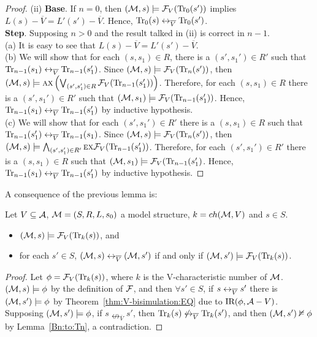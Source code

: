 \documentclass[letterpaper]{article} %
\begin{document}
\begin{proof}
(ii)  \textbf{Base}. If $n=0$, then $({\cal M}, s)  \models {\cal F}_V(\textrm{Tr}_0(s'))$ implies $L(s) - \overline V = L'(s') - \overline V$. Hence, $\textrm{Tr}_0(s) \leftrightarrow_{\overline V} \textrm{Tr}_0(s')$.\\
    \textbf{Step}. Supposing $n>0$ and the result talked in (ii) is correct in $n-1$.\\
   (a) It is easy to see that $L(s) - \overline V = L'(s') - \overline V$.\\
   (b) We will show that for each $(s, s_1) \in R$, there is a $(s', s_1') \in R'$ such that $\textrm{Tr}_{n-1}(s_1) \leftrightarrow_{\overline V} \textrm{Tr}_{n-1}(s_1')$.
      Since $({\cal M}, s) \models {\cal F}_V(\textrm{Tr}_n(s'))$, then $({\cal M}, s) \models \textsc{a} \textsc{x}\left(\bigvee_{(s',s_1')\in R}{\cal F}_V(\textrm{Tr}_{n-1}(s_1') )\right)$.
      Therefore, for each $(s, s_1) \in R$ there is a $(s', s_1') \in R'$ such that $({\cal M}, s_1) \models {\cal F}_V(\textrm{Tr}_{n-1}(s_1') )$. Hence, $\textrm{Tr}_{n-1}(s_1) \leftrightarrow_{\overline V} \textrm{Tr}_{n-1}(s_1')$ by inductive hypothesis.\\
   (c) We will show that for each $(s',s_1')\in R'$ there is a $(s,s_1)\in R$ such that $\textrm{Tr}_{n-1}(s_1') \leftrightarrow_{\overline V} \textrm{Tr}_{n-1}(s_1)$.
      Since $({\cal M}, s) \models {\cal F}_V(\textrm{Tr}_n(s'))$, then $({\cal M}, s) \models  \bigwedge_{(s',s_1')\in R'} \textsc{e} \textsc{x} {\cal F}_V(\textrm{Tr}_{n-1}(s_1'))$.
      Therefore, for each $(s',s_1')\in R'$ there is a $(s,s_1)\in R$ such that $({\cal M}, s_1) \models {\cal F}_V(\textrm{Tr}_{n-1}(s_1')$.
      Hence, $\textrm{Tr}_{n-1}(s_1) \leftrightarrow_{\overline V} \textrm{Tr}_{n-1}(s_1')$ by inductive hypothesis.
\end{proof}


A consequence of the previous lemma is:

\begin{lemma}\label{div_s}
Let $V\subseteq {\cal A}$, ${\cal M}=(S,R,L,s_0)$ a model structure, $k={ch({\cal M},V)}$ and $s\in S$.
\begin{itemize}
  \item $({\cal M}, s)\models {\cal F}_V(\textrm{Tr}_k(s))$, and
  \item for each $s'\in S$, $({\cal M},s) \leftrightarrow_{\overline V} ({\cal M},s')$
  if and only if $({\cal M},s')\models{\cal F}_V(\textrm{Tr}_k(s))$.
\end{itemize}
\end{lemma}
\begin{proof}
Let $\phi = {\cal F}_V(\textrm{Tr}_k(s))$, where $k$ is the V-characteristic number of ${\cal M}$. $({\cal M}, s) \models \phi$ by the definition of ${\cal F}$, and then $\forall s' \in S$, if $s \leftrightarrow_{\overline V} s'$ there is $({\cal M}, s') \models \phi$ by Theorem~\ref{thm:V-bisimulation:EQ} due to $\textrm{IR}(\phi, {\cal A} - V)$. Supposing $({\cal M}, s')\models \phi$, if $s \nleftrightarrow_{\overline V} s'$, then $\textrm{Tr}_k(s) \not \leftrightarrow_{\overline V} \textrm{Tr}_k(s')$, and then $({\cal M}, s')\nvDash \phi$ by Lemma~\ref{Bn:to:Tn}, a contradiction.
\end{proof}
\end{document}
